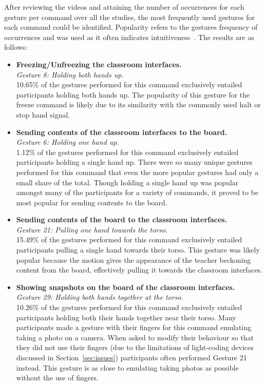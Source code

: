 \documentclass[link]{IWCOMP}
\begin{document}
After reviewing the videos and attaining the number of occurrences for each gesture per command over all the studies, the most frequently used gestures for each command could be identified.
Popularity refers to the gestures frequency of occurrences and was used as it often indicates intuitiveness~\cite{Grandhi2011}.
The results are as follows: \\

\begin{itemize}

\item \textbf{Freezing/Unfreezing the classroom interfaces.}\\
\textit{Gesture 8: Holding both hands up.}\\  
10.65\% of the gestures performed for this command exclusively entailed participants holding both hands up.
The popularity of this gesture for the freeze command is likely due to its similarity with the commonly used halt or stop hand signal.\\

\item \textbf{Sending contents of the classroom interfaces to the board.}\\
\textit{Gesture 6: Holding one hand up.}\\
1.12\% of the gestures performed for this command exclusively entailed participants holding a single hand up.
There were so many unique gestures performed for this command that even the more popular gestures had only a small share of the total.
Though holding a single hand up was popular amongst many of the participants for a variety of commands, it proved to be most popular for sending contents to the board.\\

\item \textbf{Sending contents of the board to the classroom interfaces.}\\
\textit{Gesture 21: Pulling one hand towards the torso.}\\
15.49\% of the gestures performed for this command exclusively entailed participants pulling a single hand towards their torso.
This gesture was likely popular because the motion gives the appearance of the teacher beckoning content from the board, effectively pulling it towards the classroom interfaces.\\

\item \textbf{Showing snapshots on the board of the classroom interfaces.}\\
\textit{Gesture 29: Holding both hands together at the torso.}\\
10.26\% of the gestures performed for this command exclusively entailed participants holding both their hands together near their torso.
Many participants made a gesture with their fingers for this command emulating taking a photo on a camera.
When asked to modify their behaviour so that they did not use their fingers (due to the limitations of light-coding devices discussed in Section~\ref{sec:issues}) participants often performed Gesture 21 instead.
This gesture is as close to emulating taking photos as possible without the use of fingers.\\


\end{itemize}
\end{document}
